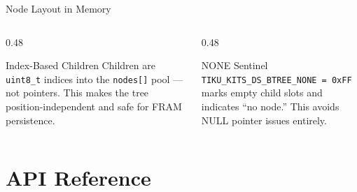 \documentclass[aspectratio=169, 10pt]{beamer}
\begin{document}
\begin{frame}{Node Layout in Memory}
\vspace{0.3em}
\begin{columns}[T]
\begin{column}{0.48\textwidth}
\begin{block}{Index-Based Children}
Children are \texttt{uint8\_t} indices into the \texttt{nodes[]} pool ---
not pointers. This makes the tree position-independent and safe
for FRAM persistence.
\end{block}
\end{column}
\begin{column}{0.48\textwidth}
\begin{block}{NONE Sentinel}
\texttt{TIKU\_KITS\_DS\_BTREE\_NONE = 0xFF} marks empty child
slots and indicates ``no node.'' This avoids NULL pointer
issues entirely.
\end{block}
\end{column}
\end{columns}
\end{frame}

\section{API Reference}
\end{document}
